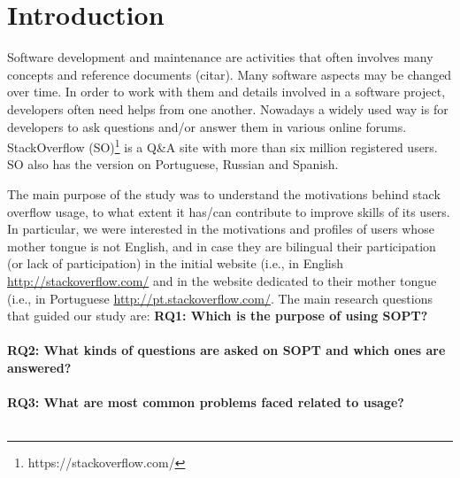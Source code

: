 \section{Introduction}

Software development and maintenance are activities that often involves many concepts and reference documents (citar). Many software aspects may be changed over time. In order to work with them and details involved in a software project, developers often need helps from one another. Nowadays a widely used way is for developers to ask questions and/or answer them in various online forums. StackOverflow (SO)\footnote{https://stackoverflow.com/} is a Q\&A site with more than six million registered users. SO also has the version on Portuguese, Russian and Spanish. 

The main purpose of the study was to understand the motivations behind stack overflow usage, to what extent it has/can contribute to improve skills of its users. In particular, we were interested in the motivations and profiles of users whose mother tongue is not English, and in case they are bilingual their participation (or lack of participation) in the initial website (i.e., in English \url{http://stackoverflow.com/} and in the website dedicated to their mother tongue (i.e., in Portuguese \url{http://pt.stackoverflow.com/}. The main research questions that guided our study are:
\noindent \textbf{RQ1: Which is the purpose of using SOPT?} \\ 
 \\
\textbf{RQ2: What kinds of questions are asked on SOPT and which ones are answered?} \\ 
\\
\textbf{RQ3: What are most common problems faced related to usage?} \\ 
\\
